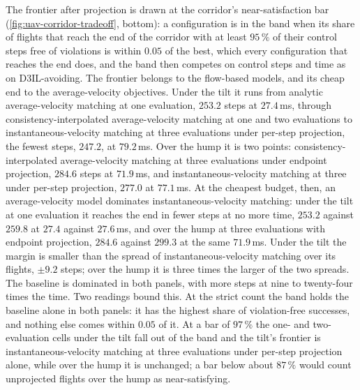 The frontier after projection is drawn at the corridor's near-satisfaction bar
(\autoref{fig:uav-corridor-tradeoff}, bottom): a configuration is in the band when its share of flights that
reach the end of the corridor with at least $95\,\%$ of their control steps free of violations is within
$0.05$ of the best, which every configuration that reaches the end does, and the band then competes on
control steps and time as on D3IL-avoiding. The frontier belongs to the flow-based models, and its cheap end
to the average-velocity objectives. Under the tilt it runs from analytic average-velocity matching at one
evaluation, $253.2$ steps at $27.4$\,ms, through consistency-interpolated average-velocity matching at one
and two evaluations to instantaneous-velocity matching at three evaluations under per-step projection, the
fewest steps, $247.2$, at $79.2$\,ms. Over the hump it is two points: consistency-interpolated
average-velocity matching at three evaluations under endpoint projection, $284.6$ steps at $71.9$\,ms, and
instantaneous-velocity matching at three under per-step projection, $277.0$ at $77.1$\,ms. At the cheapest
budget, then, an average-velocity model dominates instantaneous-velocity matching: under the tilt at one
evaluation it reaches the end in fewer steps at no more time, $253.2$ against $259.8$ at $27.4$ against
$27.6$\,ms, and over the hump at three evaluations with endpoint projection, $284.6$ against $299.3$ at the
same $71.9$\,ms. Under the tilt the margin is smaller than the spread of instantaneous-velocity matching
over its flights, $\pm9.2$ steps; over the hump it is three times the larger of the two spreads. The
baseline is dominated in both panels, with more steps at nine to twenty-four times the time. Two readings
bound this. At the strict count the band holds the baseline alone in both panels: it has the highest share of
violation-free successes, and nothing else comes within $0.05$ of it. At a bar of $97\,\%$ the one- and
two-evaluation cells under the tilt fall out of the band and the tilt's frontier is instantaneous-velocity
matching at three evaluations under per-step projection alone, while over the hump it is unchanged; a bar
below about $87\,\%$ would count unprojected flights over the hump as near-satisfying.

